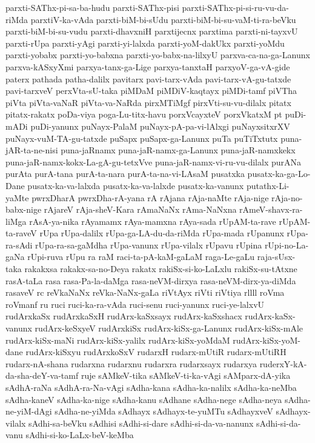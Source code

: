 {parxti-SAThx-pi-sa-ba-hudu
parxti-SAThx-pisi
parxti-SAThx-pi-si-ru-vu-da-riMda
parxtiV-ka-vAda
parxti-biM-bi-sUdu
parxti-biM-bi-su-vaM-ti-ra-beVku
parxti-biM-bi-su-vudu
parxti-dhavxniH
parxtijecnx
parxtima
parxti-ni-tayxvU
parxti-rUpa
parxti-yAgi
parxti-yi-lalxda
parxti-yoM-dakUkx
parxti-yoMdu
parxti-yobabx
parxti-yo-babxna
parxti-yo-babx-na-lilxyU
parxva-ca-na-ga-Lanunx
parxva-kASxyXmi
parxya-tanx-ga-Lige
parxya-tanxtaH
parxyoV-ga-vA-gide
paterx
pathada
patha-dalilx
pavitarx
pavi-tarx-vAda
pavi-tarx-vA-gu-tatxde
pavi-tarxveV
perxVta-sU-taka
piMDaM
piMDiV-kaqtayx
piMDi-tamf
piVTha
piVta
piVta-vaNaR
piVta-va-NaRda
pirxMTiMgf
pirxVti-su-vu-dilalx
pitatx
pitatx-rakatx
poDa-viya
poga-Lu-titx-havu
porxVcayxteV
porxVkatxM
pt
puDi-mADi
puDi-yanunx
puNayx-PalaM
puNayx-pA-pa-vi-lAlxgi
puNayxsitxrXV
puNayx-vuM-TA-gu-tatxde
puSapx
puSapx-ga-Lanunx
puTa
puTiTxtutx
puna-jAR-ta-ne-nisi
puna-jaRnamx
puna-jaR-namx-ga-Lanunx
puna-jaR-namxkekx
puna-jaR-namx-kokx-La-gA-gu-tetxVve
puna-jaR-namx-vi-ru-vu-dilalx
purANa
purAta
purA-tana
purA-ta-nara
purA-ta-na-vi-LAsaM
pusatxka
pusatx-ka-ga-Lo-Dane
pusatx-ka-va-lalxda
pusatx-ka-va-lalxde
pusatx-ka-vanunx
putathx-Li-yaMte
pwrxDharA
pwrxDha-rA-yana
rA
rAjana
rAja-naMte
rAja-nige
rAja-no-babx-nige
rAjareV
rAja-sheV-Kara
rAmaNaNx
rAma-NaNxna
rAmeV-shavx-ra-liMga
rAsA-ya-nika
rAyamamx
rAya-mamxna
rAya-sada
rUpAM-ta-rave
rUpAM-ta-raveV
rUpa
rUpa-dalilx
rUpa-ga-LA-du-da-riMda
rUpa-mada
rUpanunx
rUpa-ra-sAdi
rUpa-ra-sa-gaMdha
rUpa-vanunx
rUpa-vilalx
rUpavu
rUpina
rUpi-no-La-gaNa
rUpi-ruva
rUpu
ra
raM
raci-ta-pA-kaM-gaLaM
raga-Le-gaLu
raja-sUsx-taka
rakakxsa
rakakx-sa-no-Deya
rakatx
rakiSx-si-ko-LaLxlu
rakiSx-su-tAtxne
rasA-taLa
rasa
rasa-Pa-la-daMga
rasa-neVM-dirxya
rasa-neVM-dirx-ya-diMda
rasaveV
rc
reVkaNaNx
reVka-NaNx-gaLa
riVtAyx
riVti
riVtiya
rllll
roVma
roVmanf
ru
ruci
ruci-ka-ra-vAda
ruci-senu
ruci-yanunx
ruci-ye-lalxvU
rudArxkaSx
rudArxkaSxH
rudArx-kaSxsayx
rudArx-kaSxshacx
rudArx-kaSx-vanunx
rudArx-keSxyeV
rudArxkiSx
rudArx-kiSx-ga-Lanunx
rudArx-kiSx-mAle
rudArx-kiSx-maNi
rudArx-kiSx-yalilx
rudArx-kiSx-yoMdaM
rudArx-kiSx-yoM-dane
rudArx-kiSxyu
rudArxkoSxV
rudarxH
rudarx-mUtiR
rudarx-mUtiRH
rudarx-nA-shana
rudarxna
rudarxnu
rudarxra
rudarxsayx
rudarxya
ruderxY-kA-da-sha-deY-va-tamf
ruje
sAMkeV-tika
sAMkeV-ti-ka-vAgi
sAMparx-dA-yika
sAdhA-raNa
sAdhA-ra-Na-vAgi
sAdha-kana
sAdha-ka-nalilx
sAdha-ka-neMba
sAdha-kaneV
sAdha-ka-nige
sAdha-kanu
sAdhane
sAdha-nege
sAdha-neya
sAdha-ne-yiM-dAgi
sAdha-ne-yiMda
sAdhayx
sAdhayx-te-yuMTu
sAdhayxveV
sAdhayx-vilalx
sAdhi-sa-beVku
sAdhisi
sAdhi-si-dare
sAdhi-si-da-va-nanunx
sAdhi-si-da-vanu
sAdhi-si-ko-LaLx-beV-keMba
}
